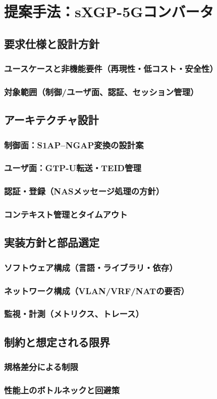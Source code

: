 \chapter{提案手法：sXGP-5Gコンバータ}
\label{chap:proposal}

\section{要求仕様と設計方針}
\subsection{ユースケースと非機能要件（再現性・低コスト・安全性）}
\subsection{対象範囲（制御/ユーザ面、認証、セッション管理）}

\section{アーキテクチャ設計}
\subsection{制御面：S1AP–NGAP変換の設計案}
\subsection{ユーザ面：GTP-U転送・TEID管理}
\subsection{認証・登録（NASメッセージ処理の方針）}
\subsection{コンテキスト管理とタイムアウト}

\section{実装方針と部品選定}
\subsection{ソフトウェア構成（言語・ライブラリ・依存）}
\subsection{ネットワーク構成（VLAN/VRF/NATの要否）}
\subsection{監視・計測（メトリクス、トレース）}

\section{制約と想定される限界}
\subsection{規格差分による制限}
\subsection{性能上のボトルネックと回避策}
